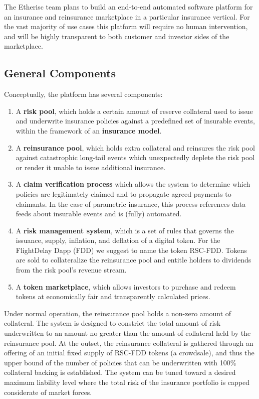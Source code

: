 \documentclass[12pt]{article}
\begin{document}
The Etherisc team plans to build an end-to-end automated software platform for an insurance and reinsurance marketplace in a particular insurance vertical. For the vast majority of use cases this platform will require no human intervention, and will be highly transparent to both customer and investor sides of the marketplace.

\subsection{General Components}

Conceptually, the platform has several components: 

\begin{enumerate}
    
    \item A \textbf{risk pool}, which holds a certain amount of reserve collateral used to issue and underwrite insurance policies against a predefined set of insurable events, within the framework of an \textbf{insurance model}. 

    \item A \textbf{reinsurance pool}, which holds extra collateral and reinsures the risk pool against catastrophic long-tail events which unexpectedly deplete the risk pool or render it unable to issue additional insurance.

    \item A \textbf{claim verification process} which allows the system to determine which policies are legitimately claimed and to propagate agreed payments to claimants. In the case of parametric insurance, this process references data feeds about insurable events and is (fully) automated.
    
    \item A \textbf{risk management system}, which is a set of rules that governs the issuance, supply, inflation, and deflation of a digital token. For the FlightDelay Dapp (FDD) we suggest to name the token RSC-FDD. Tokens are sold to collateralize the reinsurance pool and entitle holders to dividends from the risk pool's revenue stream.

    \item A \textbf{token marketplace}, which allows investors to purchase and redeem tokens at economically fair and transparently calculated prices.

\end{enumerate}

Under normal operation, the reinsurance pool holds a non-zero amount of collateral. The system is designed to constrict the total amount of risk underwritten to an amount no greater than the amount of collateral held by the reinsurance pool. At the outset, the reinsurance collateral is gathered through an offering of an initial fixed supply of RSC-FDD tokens (a crowdsale), and thus the upper bound of the number of policies that can be underwritten with 100\% collateral backing is established. The system can be tuned toward a desired maximum liability level where the total risk of the insurance portfolio is capped considerate of market forces.
\end{document}
